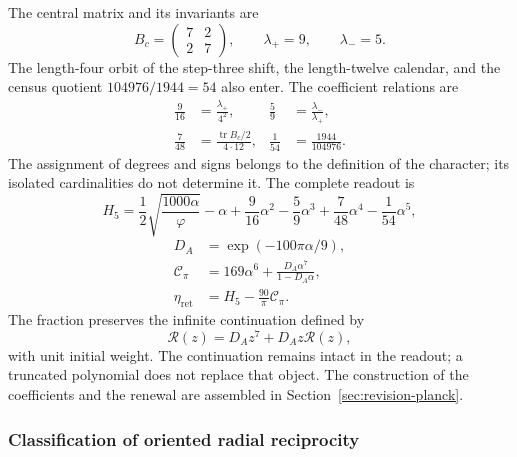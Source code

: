 The central matrix and its invariants are
\begin{equation}
 B_c=\begin{pmatrix}7&2\\2&7\end{pmatrix},\qquad
 \lambda_+=9,\qquad\lambda_-=5.
 \label{md:restop:matriz-central}
\end{equation}
The length-four orbit of the step-three shift, the
length-twelve calendar, and the census quotient $104976/1944=54$ also enter.
The coefficient relations are
\begin{equation}
 \begin{aligned}
 \frac9{16}&=\frac{\lambda_+}{4^2},&
 \frac59&=\frac{\lambda_-}{\lambda_+},\\
 \frac7{48}&=\frac{\operatorname{tr}B_c/2}{4\cdot12},&
 \frac1{54}&=\frac{1944}{104976}.
 \end{aligned}
 \label{md:restop:coeficientes-h5}
\end{equation}
The assignment of degrees and signs belongs to the definition of the character;
its isolated cardinalities do not determine it. The complete readout is
\begin{equation}
 H_5=\frac12\sqrt{\frac{1000\alpha}{\varphi}}-\alpha
 +\frac9{16}\alpha^2-\frac59\alpha^3
 +\frac7{48}\alpha^4-\frac1{54}\alpha^5,
 \label{md:restop:h5-completo}
\end{equation}
\begin{equation}
 \begin{aligned}
 D_A&=\exp(-100\pi\alpha/9),\\
 \mathcal C_\pi&=169\alpha^6+
 \frac{D_A\alpha^7}{1-D_A\alpha},\\
 \eta_{\mathrm{ret}}&=H_5-\frac{90}{\pi}\mathcal C_\pi.
 \end{aligned}
 \label{md:restop:retorno-regional}
\end{equation}
The fraction preserves the infinite continuation defined by
\begin{equation}
 \mathscr R(z)=D_Az^7+D_Az\mathscr R(z),
 \label{md:restop:renovacion}
\end{equation}
with unit initial weight. The continuation remains intact in the
readout; a truncated polynomial does not replace that object. The construction
of the coefficients and the renewal are assembled in
Section~\ref{sec:revision-planck}.

\subsubsection{Classification of oriented radial reciprocity}
\label{md:restop:geometria}

